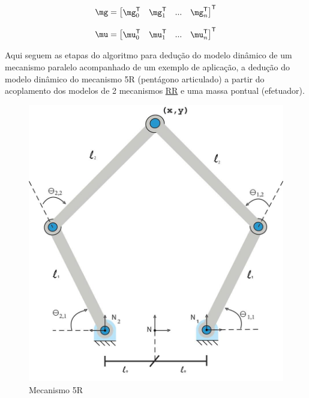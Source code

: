\documentclass[a4paper,11pt,brazil,fleqn]{article}
\begin{document}
\begin{equation} \label{eq:Matrizg2}
\mg = \begin{bmatrix}
\mg_0^\msT & \mg_1^\msT & ... & \mg_{n}^\msT
\end{bmatrix}^\msT
\end{equation}

\begin{equation}
\mu =
\begin{bmatrix} \label{eq:Matrizu}
\mu_0^\msT & \mu_1^\msT & ... & \mu_{n}^\msT
\end{bmatrix}^\msT
\end{equation}

Aqui seguem as etapas do algoritmo para dedu\c{c}\~ao do modelo din\^amico de um mecanismo paralelo acompanhado de um exemplo de aplica\c{c}\~ao, a dedu\c{c}\~ao do modelo din\^amico do mecanismo 5R (pent\'agono articulado) a partir do acoplamento dos modelos de 2 mecanismos \underline{R}\underline{R} e uma massa pontual (efetuador).

\begin{figure}[H]
	\centering
	\includegraphics[scale=0.4]{5Rscan.jpg}
	\caption{Mecanismo 5R}
	\label{fig:RR}
\end{figure}
\end{document}

